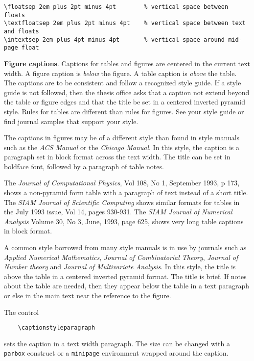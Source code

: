\footnotesize\begin{verbatim}
\floatsep 2em plus 2pt minus 4pt        % vertical space between floats
\textfloatsep 2em plus 2pt minus 4pt    % vertical space between text and floats
\intextsep 2em plus 4pt minus 4pt       % vertical space around mid-page float
\end{verbatim}\normalsize


{\bf Figure captions}.
Captions for tables and figures are centered in the current text width.
A figure caption is {\em below} the figure. A table caption is {\em
above} the table. The captions are to be consistent and follow a
recognized style guide. If a style guide is not followed, then the
thesis office asks that a caption not extend beyond the table or figure
edges and that the title be set in a centered inverted pyramid style.
Rules for tables are different than rules for figures. See your style
guide or find journal samples that support your style.

The captions in figures may be of a different style than found in style
manuals such as the {\em ACS Manual} or the {\em Chicago Manual}. In
this style, the caption is a paragraph set in block format across the
text width. The title can be set in boldface font, followed by a
paragraph of table notes.

The {\em Journal of Computational Physics}, Vol 108, No 1, September
1993, p 173, shows a non-pyramid form table with a paragraph of text
instead of a short title. The {\em SIAM Journal of Scientific Computing}
shows similar formats for tables in the July 1993 issue, Vol 14, pages
930-931. The {\em SIAM Journal of Numerical Analysis} Volume 30, No 3,
June, 1993, page 625, shows very long table captions in block format.

A common style borrowed from many style manuals is in use by journals
such as {\em Applied Numerical Mathematics}, {\em Journal of
Combinatorial Theory}, {\em Journal of Number theory} and {\em Journal
of Multivariate Analysis}. In this style, the title is above the table
in a centered inverted pyramid format. The title is brief. If notes
about the table are needed, then they appear below the table in a text
paragraph or else in the main text near the reference to the figure.

The control

\verb"    \captionstyleparagraph"

sets the caption in a text width paragraph. The size can be changed with
a {\tt parbox} construct or a {\tt minipage} environment wrapped around
the caption.

